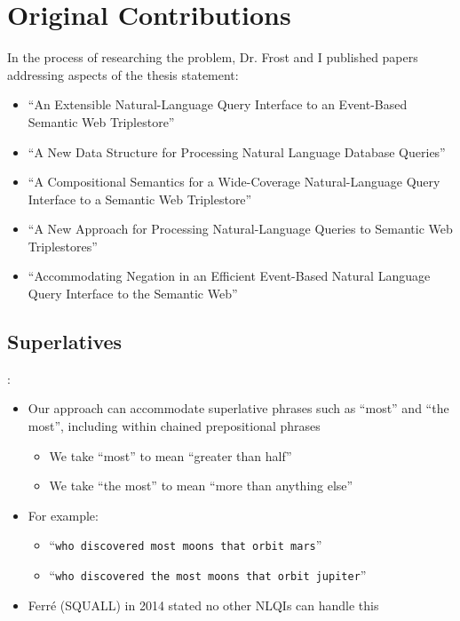 \documentclass[logoontitle,tabu,supertabular,aspectratio=43]{preney-uwindsor-beamer}
\begin{document}
    \section{Original Contributions}

    \begin{frame}{\insertsection}
        In the process of researching the problem, Dr. Frost and I published papers addressing aspects of the thesis statement:
        \begin{itemize}
            \item ``An Extensible Natural-Language Query Interface to an Event-Based Semantic Web Triplestore'' \cite{frost2018extensible}
            \item ``A New Data Structure for Processing Natural Language Database Queries'' \cite{frostpeelar2019}
            \item ``A Compositional Semantics for a Wide-Coverage Natural-Language Query Interface to a Semantic Web Triplestore'' \cite{peelar2020compositional}
            \item ``A New Approach for Processing Natural-Language Queries to Semantic Web Triplestores'' \cite{peelar2020webistjournal}
            \item ``Accommodating Negation in an Efficient Event-Based Natural Language Query Interface to the Semantic Web'' \cite{peelarfrostwebist2020}
        \end{itemize}

    \end{frame}

    \subsection{Superlatives}
    \begin{frame}{\insertsection: \insertsubsection}
        \begin{itemize}
            \item Our approach can accommodate superlative phrases such as ``most'' and ``the most'', including within chained prepositional phrases
            \begin{itemize}
                \item We take ``most'' to mean ``greater than half''
                \item We take ``the most'' to mean ``more than anything else''
            \end{itemize}
            \item For example:
            \begin{itemize}
                \item ``\texttt{who discovered most moons that orbit mars}''
                \item ``\texttt{who discovered the most moons that orbit jupiter}''
            \end{itemize}
            \item Ferré (SQUALL) in 2014 stated no other NLQIs can handle this \cite{ferre2014squall}
        \end{itemize}
    \end{frame}
\end{document}
